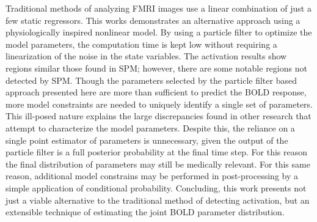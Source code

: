 \documentclass[12pt]{report}
\numberwithin{algorithm}{chapter}
\begin{document}
Traditional methods of analyzing FMRI images use a linear combination of
just a few static regressors. This works demonstrates an alternative
approach using a physiologically inspired nonlinear model. By using a 
particle filter to optimize the model parameters, the computation time
is kept low without requiring a linearization of the noise in the state
variables. The activation results show regions similar those found in 
SPM; however, there are some notable regions not detected by 
SPM. Though the parameters selected by the particle filter based approach
presented here are more than sufficient to predict the BOLD response,
more model constraints are needed to uniquely identify a single set
of parameters. This ill-posed nature explains the large discrepancies
found in other research that attempt to characterize the model parameters.
Despite this, the reliance on a single point estimator of parameters is
unnecessary, given the output of the particle filter is a full posterior
probability at the final time step. For this reason the final distribution 
of parameters may still be medically relevant. For this same reason,
additional model constrains may be performed in post-processing by a simple 
application of conditional probability. Concluding, this work presents
not just a viable alternative to the traditional method of detecting
activation, but an extensible technique of estimating the joint BOLD
parameter distribution.

\vfill



\pagebreak


\tableofcontents
\pagebreak

\listoffigures
\pagebreak

\listoftables
\pagebreak

\pagestyle{myheadings}










%
%
%

\end{document}

